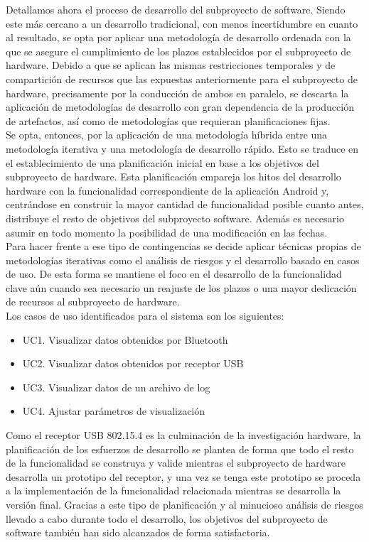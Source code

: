 	Detallamos ahora el proceso de desarrollo del subproyecto de software. Siendo este más cercano a un desarrollo tradicional, con menos incertidumbre en cuanto al resultado, se opta por aplicar una metodología de desarrollo ordenada con la que se asegure el cumplimiento de los plazos establecidos por el subproyecto de hardware. Debido a que se aplican las mismas restricciones temporales y de compartición de recursos que las expuestas anteriormente para el subproyecto de hardware, precisamente por la conducción de ambos en paralelo, se descarta la aplicación de metodologías de desarrollo con gran dependencia de la producción de artefactos, así como de metodologías que requieran planificaciones fijas.\\

	Se opta, entonces, por la aplicación de una metodología híbrida entre una metodología iterativa y una metodología de desarrollo rápido. Esto se traduce en el establecimiento de una planificación inicial en base a los objetivos del subproyecto de hardware. Esta planificación empareja los hitos del desarrollo hardware con la funcionalidad correspondiente de la aplicación Android y, centrándose en construir la mayor cantidad de funcionalidad posible cuanto antes, distribuye el resto de objetivos del subproyecto software. Además es necesario asumir en todo momento la posibilidad de una modificación en las fechas. \\

	Para hacer frente a ese tipo de contingencias se decide aplicar técnicas propias de metodologías iterativas como el análisis de riesgos y el desarrollo basado en casos de uso. De esta forma se mantiene el foco en el desarrollo de la funcionalidad clave aún cuando sea necesario un reajuste de los plazos o una mayor dedicación de recursos al subproyecto de hardware.\\

	Los casos de uso identificados para el sistema son los siguientes:

	\begin{itemize}
		\item UC1. Visualizar datos obtenidos por Bluetooth
		\item UC2. Visualizar datos obtenidos por receptor USB
		\item UC3. Visualizar datos de un archivo de log
		\item UC4. Ajustar parámetros de visualización
	\end{itemize}

	Como el receptor USB 802.15.4 es la culminación de la investigación hardware, la planificación de los esfuerzos de desarrollo se plantea de forma que todo el resto de la funcionalidad se construya y valide mientras el subproyecto de hardware desarrolla un prototipo del receptor, y una vez se tenga este prototipo se proceda a la implementación de la funcionalidad relacionada mientras se desarrolla la versión final. Gracias a este tipo de planificación y al minucioso análisis de riesgos llevado a cabo durante todo el desarrollo, los objetivos del subproyecto de software también han sido alcanzados de forma satisfactoria.